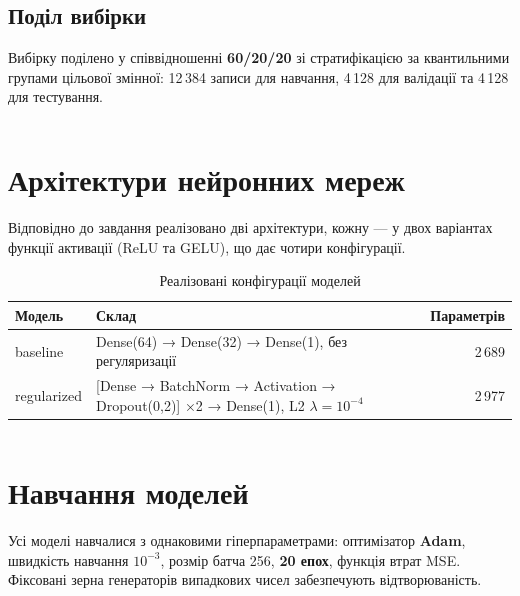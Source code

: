 \documentclass[14pt,a4paper]{extreport}
\begin{document}
\subsection{Поділ вибірки}

Вибірку поділено у співвідношенні \textbf{60/20/20} зі стратифікацією за квантильними групами цільової змінної: 12\,384 записи для навчання, 4\,128 для валідації та 4\,128 для тестування.

\begin{listing}[H]
\inputminted[firstline=32,lastline=56]{python}{../src/aiit/data.py}
\caption{Поділ вибірки та масштабування (\texttt{src/data.py})}
\label{lst:data}
\end{listing}

\section{Архітектури нейронних мереж}

Відповідно до завдання реалізовано дві архітектури, кожну --- у двох варіантах функції активації (ReLU та GELU), що дає чотири конфігурації.

\begin{table}[H]
\caption{Реалізовані конфігурації моделей}
\label{tab:arch}
\begin{tabularx}{\linewidth}{|l|X|r|}
\hline
\textbf{Модель} & \textbf{Склад} & \textbf{Параметрів} \\
\hline
baseline & Dense(64) → Dense(32) → Dense(1), без регуляризації & 2\,689 \\
\hline
regularized & [Dense → BatchNorm → Activation → Dropout(0,2)] ×2 → Dense(1), L2 $\lambda = 10^{-4}$ & 2\,977 \\
\hline
\end{tabularx}
\end{table}

\begin{listing}[H]
\inputminted[firstline=20,lastline=50]{python}{../src/aiit/tf_models.py}
\caption{Архітектури моделей у TensorFlow (\texttt{src/tf\_models.py})}
\label{lst:tfmodels}
\end{listing}

\section{Навчання моделей}

Усі моделі навчалися з однаковими гіперпараметрами: оптимізатор \textbf{Adam}, швидкість навчання $10^{-3}$, розмір батча 256, \textbf{20 епох}, функція втрат MSE. Фіксовані зерна генераторів випадкових чисел забезпечують відтворюваність.
\end{document}

